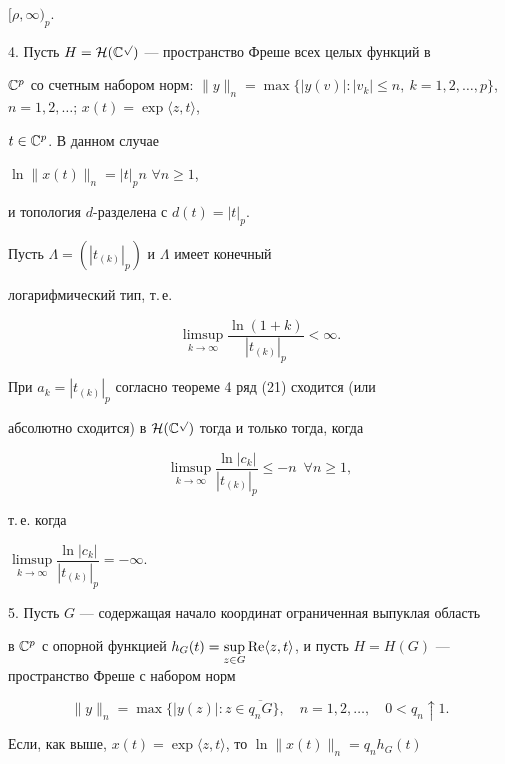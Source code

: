 $[\rho,\infty)_p$.


\medskip





4. Пусть $H=\cal H(\Bbb C^p)$ --- пространство Фреше всех целых функций в


$\Bbb C^p$ со счетным набором норм: $\|y\|_n=\max\{|y(v)|:|v_k|\leqslant


n,\ k=1,2,\dotsc,p\}$, $n=1,2,\dotsc$; $x(t)=\exp\langle z,t\rangle$,


$t\in\Bbb C^p$. В данном случае 


$\ln\|x(t)\|_n=|t|_p n$ $\forall n\geqslant 1$,


и топология $d$-разделена с $d(t)=|t|_p$.


Пусть $\Lambda=(|t_{(k)}|_p)$ и $\Lambda$ имеет конечный


логарифмический тип, т.\,е.


$$


\limsup\limits_{k\to\infty}\dfrac{\ln(1+k)}{|t_{(k)}|_p}<\infty.


$$


При $a_k=|t_{(k)}|_p$ согласно теореме 4 ряд (21) сходится (или


абсолютно сходится) в $\cal H(\Bbb C^p)$ тогда и только тогда, когда


$$


\limsup\limits_{k\to\infty}\dfrac{\ln|c_k|}{|t_{(k)}|_p}\leqslant -n


\ \;\forall n\geqslant 1,


$$


т.\,е. когда


$\limsup\limits_{k\to\infty}\dfrac{\ln|c_k|}{|t_{(k)}|_p}=-\infty.$


\medskip





5. Пусть $G$ --- содержащая начало координат ограниченная выпуклая область


в $\Bbb C^p$ с опорной функцией $h_G(t)=\sup\limits_{z\in G}\re\langle


z,t\rangle$, и пусть $H=H(G)$ --- пространство Фреше с набором норм


$$


\|y\|_n=\max\{|y(z)|:z\in\overline{q_nG}\},\quad n=1,2,\dotsc,\quad


0<q_n\uparrow 1.


$$


Если, как выше, $x(t)=\exp\langle z,t\rangle$, то $\ln\|x(t)\|_n=q_nh_G(t)$


